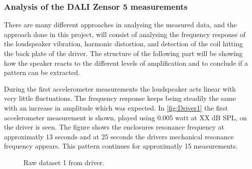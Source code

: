 \subsubsection{Analysis of the DALI Zensor 5 measurements}

There are many different approaches in analysing the measured data, and the approach done in this project, will consist of analysing the frequency response of the loudspeaker vibration, harmonic distortion, and detection of the coil hitting the back plate of the driver. The structure of the following part will be showing how the speaker reacts to the different levels of amplification and to conclude if a pattern can be extracted.




During the first accelerometer measurements the loudspeaker acts linear with very little fluctuations. The frequency response keeps being steadily the same with an increase in amplitude which was expected. In \autoref{fig:Driver1} the first accelerometer measurement is shown, played using 0.005 watt at XX dB SPL, on the driver is seen. The figure shows the enclosures resonance frequency at approximatly 13 seconds and at 25 seconds the drivers mechanical resonance frequency appears. This pattern continues for approximatly 15 measurements. 


\begin{figure}[H]
\centering
\begin{subfigure}[t]{0.335\textwidth}
	
\end{subfigure}
\caption{Raw dataset 1 from driver.}
\label{fig:Driver1}
\end{figure}

